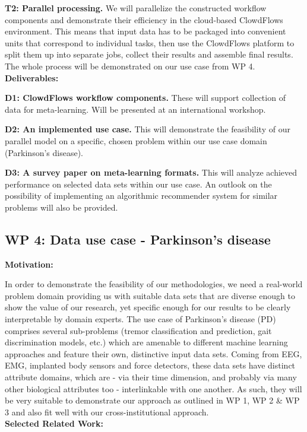 \documentclass[a4paper,11pt]{article}
\begin{document}
\textbf{T2: Parallel processing.} We will parallelize the constructed workflow components and demonstrate their efficiency in the cloud-based ClowdFlows environment. This means that input data has to be packaged into convenient units that correspond to individual tasks, then use the ClowdFlows platform to split them up into separate jobs, collect their results and assemble final results. The whole process will be demonstrated on our use case from WP 4.
\\[0,2cm]
\textbf{Deliverables:}

\textbf{D1: ClowdFlows workflow components.} These will support collection of data for meta-learning. Will be presented at an international workshop.

\textbf{D2: An implemented use case.} This will demonstrate the feasibility of our parallel model on a specific, chosen problem within our use case domain (Parkinson's disease).

\textbf{D3: A survey paper on meta-learning formats.} This will analyze achieved performance on selected data sets within our use case. An outlook on the possibility of implementing an algorithmic recommender system for similar problems will also be provided.



\subsection{WP 4: Data use case - Parkinson's disease }
\textbf{Motivation:} 

In order to demonstrate the feasibility of our methodologies, we need a real-world problem domain providing us with suitable data sets that are diverse enough to show the value of our research, yet specific enough for our results to be clearly interpretable by domain experts. The use case of Parkinson's disease (PD) comprises several sub-problems (tremor classification and prediction, gait discrimination models, etc.) which are amenable to different machine learning approaches and feature their own, distinctive input data sets. Coming from EEG, EMG, implanted body sensors and force detectors, these data sets have distinct attribute domains, which are - via their time dimension, and probably via many other biological attributes too -  interlinkable with one another. As such, they will be very suitable to demonstrate our approach as outlined in WP 1, WP 2  \& WP 3 and also fit well with our cross-institutional approach.
%
%
\\[0,2cm]
\textbf{Selected Related Work:}
\end{document}
